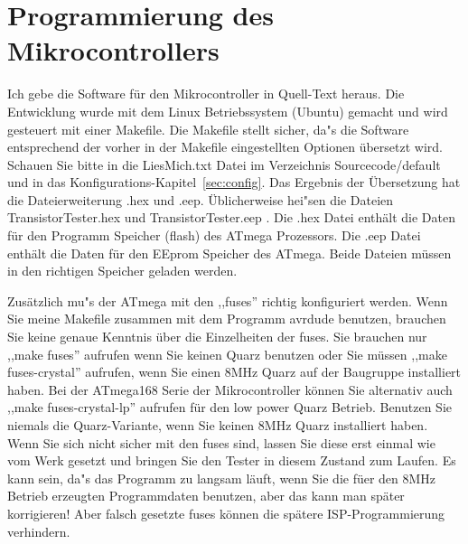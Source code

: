 \section{Programmierung des Mikrocontrollers}
Ich gebe die Software f\"ur den Mikrocontroller in Quell-Text heraus.
Die Entwicklung wurde mit dem Linux Betriebssystem (Ubuntu) gemacht
und wird gesteuert mit einer Makefile.
Die Makefile stellt sicher, da"s die Software entsprechend der vorher in der Makefile 
eingestellten Optionen \"ubersetzt wird. Schauen Sie bitte in die LiesMich.txt Datei
im Verzeichnis Sourcecode/default und in das Konfigurations-Kapitel~\ref{sec:config}.
Das Ergebnis der \"Ubersetzung hat die Dateierweiterung .hex und .eep.
\"Ublicherweise hei"sen die Dateien TransistorTester.hex und TransistorTester.eep .
Die .hex Datei enth\"alt die Daten f\"ur den Programm Speicher (flash) des ATmega Prozessors.
Die .eep Datei enth\"alt die Daten f\"ur den EEprom Speicher des ATmega.
Beide Dateien m\"ussen in den richtigen Speicher geladen werden.

Zus\"atzlich mu"s der ATmega mit den ,,fuses'' richtig konfiguriert werden.
Wenn Sie meine Makefile zusammen mit dem Programm avrdude benutzen, brauchen Sie
keine genaue Kenntnis \"uber die Einzelheiten der fuses.
Sie brauchen nur ,,make fuses'' aufrufen wenn Sie keinen Quarz benutzen oder Sie
m\"ussen ,,make fuses-crystal'' aufrufen, wenn Sie einen 8MHz Quarz auf der Baugruppe installiert haben.
Bei der ATmega168 Serie der Mikrocontroller k\"onnen Sie alternativ auch
,,make fuses-crystal-lp'' aufrufen f\"ur den low power Quarz Betrieb.
Benutzen Sie niemals die Quarz-Variante, wenn Sie keinen 8MHz Quarz installiert haben.
Wenn Sie sich nicht sicher mit den fuses sind, lassen Sie diese erst einmal wie
vom Werk gesetzt und bringen Sie den Tester in diesem Zustand zum Laufen.
Es kann sein, da"s das Programm zu langsam l\"auft, wenn Sie die f\"uer den 8MHz Betrieb 
erzeugten Programmdaten benutzen, aber das kann man sp\"ater korrigieren!
Aber falsch gesetzte fuses k\"onnen die sp\"atere ISP-Programmierung verhindern.

